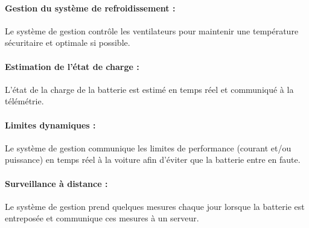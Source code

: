 		\paragraph{Gestion du système de refroidissement :} 	
		Le système de gestion contrôle les ventilateurs pour maintenir une température sécuritaire et optimale si possible.
		
		\paragraph{Estimation de l'état de charge :}	
		L'état de la charge de la batterie est estimé en temps réel et communiqué à la télémétrie.
		
		\paragraph{Limites dynamiques :}	
		Le système de gestion communique les limites de performance (courant et/ou puissance) en temps réel à la voiture afin d’éviter que la batterie entre en faute.
		
		\paragraph{Surveillance à distance :}	
		Le système de gestion prend quelques mesures chaque jour lorsque la batterie est entreposée et communique ces mesures à un serveur.